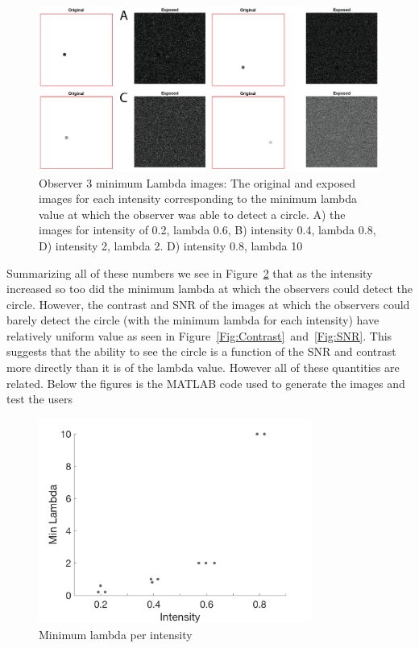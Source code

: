 \documentclass[12pt]{article}
\begin{document}
\begin{figure}[H]
	
	\includegraphics[width=\textwidth]{Figures/Obs3_fig.png}
	\caption{Observer 3 minimum Lambda images: The original and exposed images for each intensity corresponding to the minimum lambda value at which the observer was able to detect a circle. A) the images for intensity of 0.2, lambda 0.6, B) intensity 0.4, lambda 0.8, D) intensity 2, lambda 2. D) intensity 0.8, lambda 10}
	\label{Fig:obs3Img}
\end{figure}

Summarizing all of these numbers we see in Figure~\ref{Fig:lambdas} that as the intensity increased so too did the minimum lambda at which the observers could detect the circle. However, the contrast and SNR of the images at which the observers could barely detect the circle (with the minimum lambda for each intensity) have relatively uniform value as seen in Figure~\ref{Fig:Contrast}~and~\ref{Fig:SNR}. This suggests that the ability to see the circle is a function of the SNR and contrast more directly than it is of the lambda value. However all of these quantities are related. Below the figures is the MATLAB code used to generate the images and test the users

\begin{figure}[H]
	\centering
	\includegraphics[width=0.8\textwidth]{Figures/Lambda.png}
	\caption{Minimum lambda per intensity}
	\label{Fig:lambdas}
\end{figure}
\end{document}
